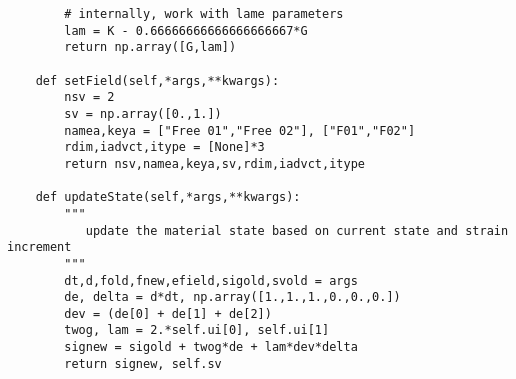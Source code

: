 \documentclass[11pt]{article}
\begin{document}
\begin{verbatim}
        # internally, work with lame parameters
        lam = K - 0.66666666666666666667*G
        return np.array([G,lam])

    def setField(self,*args,**kwargs):
        nsv = 2
        sv = np.array([0.,1.])
        namea,keya = ["Free 01","Free 02"], ["F01","F02"]
        rdim,iadvct,itype = [None]*3
        return nsv,namea,keya,sv,rdim,iadvct,itype

    def updateState(self,*args,**kwargs):
        """
           update the material state based on current state and strain increment
        """
        dt,d,fold,fnew,efield,sigold,svold = args
        de, delta = d*dt, np.array([1.,1.,1.,0.,0.,0.])
        dev = (de[0] + de[1] + de[2])
        twog, lam = 2.*self.ui[0], self.ui[1]
        signew = sigold + twog*de + lam*dev*delta
        return signew, self.sv
\end{verbatim}
\end{document}
